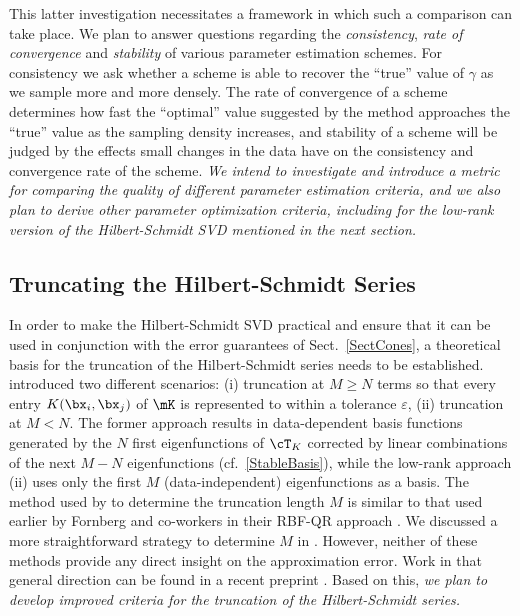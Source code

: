 This latter investigation necessitates a framework in which such a comparison can take place. We plan to answer questions regarding the \emph{consistency}, \emph{rate of convergence} and \emph{stability} of various parameter estimation schemes. For consistency we ask whether a scheme is able to recover the ``true'' value of $\gamma$ as we sample more and more densely. The rate of convergence of a scheme determines how fast the ``optimal'' value suggested by the method approaches the ``true'' value as the sampling density increases, and stability of a scheme will be judged by the effects small changes in the data have on the consistency and convergence rate of the scheme. \emph{We intend to investigate and introduce a metric for comparing the quality of different parameter estimation criteria, and we also plan to derive other parameter optimization criteria, including for the low-rank version of the Hilbert-Schmidt SVD mentioned in the next section.}


\subsection{Truncating the Hilbert-Schmidt Series}\label{Sec_TruncHS}
In order to make the Hilbert-Schmidt SVD practical and ensure that it can be used in conjunction with the error guarantees of Sect.~\ref{SectCones}, a theoretical basis for the truncation of the Hilbert-Schmidt series needs to be established. \cite{FMcC12} introduced two different scenarios: (i) truncation at $M\ge N$ terms so that every entry $K(\bx_i,\bx_j)$ of $\mK$ is represented to within a tolerance $\varepsilon$, (ii) truncation at $M < N$. The former approach results in data-dependent basis functions generated by the $N$ first eigenfunctions of $\cT_K$ corrected by linear combinations of the next $M-N$ eigenfunctions (cf.~\eqref{StableBasis}), while the low-rank approach (ii) uses only the first $M$ (data-independent) eigenfunctions as a basis. The method used by \cite{FMcC12} to determine the truncation length $M$ is similar to that used earlier by Fornberg and co-workers in their RBF-QR approach \citep{FornbergPiret08, FornbergFlyerLarsson11}.  We discussed a more straightforward strategy to determine $M$ in \cite{CFMcC13}. However, neither of these methods provide any direct insight on the approximation error. Work in that general direction can be found in a recent preprint \citep{GriebelRiegerZwicknagl13}. Based on this, \emph{we plan to develop improved criteria for the truncation of the Hilbert-Schmidt series.}

